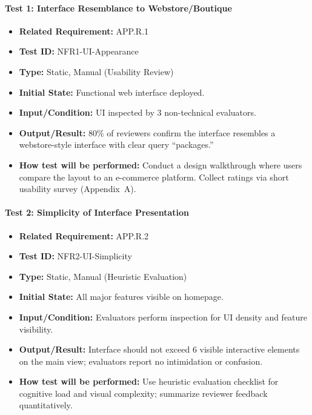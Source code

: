 \documentclass[12pt, titlepage]{article}
\begin{document}
\paragraph{Test 1: Interface Resemblance to Webstore/Boutique}
\begin{itemize}
    \item \textbf{Related Requirement:} APP.R.1
    \item \textbf{Test ID:} NFR1-UI-Appearance
    \item \textbf{Type:} Static, Manual (Usability Review)
    \item \textbf{Initial State:} Functional web interface deployed.
    \item \textbf{Input/Condition:} UI inspected by 3 non-technical evaluators.
    \item \textbf{Output/Result:} 80\% of reviewers confirm the interface resembles a webstore-style interface with clear query “packages.”
    \item \textbf{How test will be performed:} Conduct a design walkthrough where users compare the layout to an e-commerce platform. Collect ratings via short usability survey (Appendix~A).
\end{itemize}

\paragraph{Test 2: Simplicity of Interface Presentation}
\begin{itemize}
    \item \textbf{Related Requirement:} APP.R.2
    \item \textbf{Test ID:} NFR2-UI-Simplicity
    \item \textbf{Type:} Static, Manual (Heuristic Evaluation)
    \item \textbf{Initial State:} All major features visible on homepage.
    \item \textbf{Input/Condition:} Evaluators perform inspection for UI density and feature visibility.
    \item \textbf{Output/Result:} Interface should not exceed 6 visible interactive elements on the main view; evaluators report no intimidation or confusion.
    \item \textbf{How test will be performed:} Use heuristic evaluation checklist for cognitive load and visual complexity; summarize reviewer feedback quantitatively.
\end{itemize}
\end{document}
